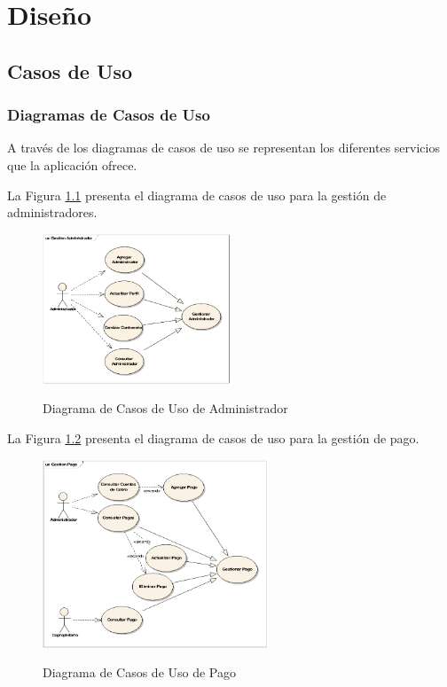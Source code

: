 \chapter{Diseño}
\section{Casos de Uso}
\subsection{Diagramas de Casos de Uso}
A través de los diagramas de casos de uso se representan los diferentes servicios que la aplicación ofrece.

La Figura \ref{fig:Diagrama-de-Casos-de-Uso-de-Administrador} presenta el diagrama de casos de uso para la gestión de administradores.

\begin{figure}[ht] 
\centering
\caption{Diagrama de Casos de Uso de Administrador}
\includegraphics[width=0.5\textwidth]{img/cuAdministrador.png}
\label{fig:Diagrama-de-Casos-de-Uso-de-Administrador}  
\end{figure} 

La Figura \ref{fig:Diagrama-de-Casos-de-Uso-de-Pago} presenta el diagrama de casos de uso para la gestión de pago.

\begin{figure}[ht] 
\centering
\caption{Diagrama de Casos de Uso de Pago}
\includegraphics[width=0.6\textwidth]{img/cuPago.png}
\label{fig:Diagrama-de-Casos-de-Uso-de-Pago}  
\end{figure} 

